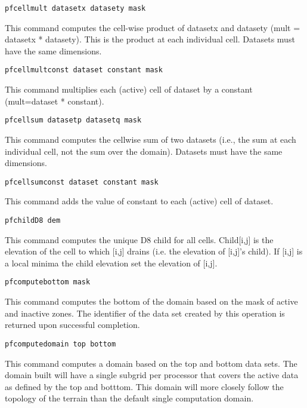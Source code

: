 \begin{description}
\item{\begin{verbatim}pfcellmult datasetx datasety mask\end{verbatim}}
This command computes the cell-wise product of datasetx and datasety (mult = datasetx * datasety).
This is the product at each individual cell. Datasets must have the same dimensions.

\item{\begin{verbatim}pfcellmultconst dataset constant mask\end{verbatim}}
This command multiplies each (active) cell of dataset by a constant (mult=dataset * constant). 


\item{\begin{verbatim}pfcellsum datasetp datasetq mask\end{verbatim}}
This command computes the cellwise sum of two datasets (i.e., the sum at each
individual cell, not the sum over the domain). Datasets must have the same
dimensions. 


\item{\begin{verbatim}pfcellsumconst dataset constant mask\end{verbatim}}
This command adds the value of constant to each (active) cell of dataset. 

\item{\begin{verbatim}pfchildD8 dem\end{verbatim}}
This command computes the unique D8 child for all cells. Child[i,j] is the
elevation of the cell to which [i,j] drains (i.e. the elevation of [i,j]'s 
child). If [i,j] is a local minima the child elevation set the elevation of [i,j].

\item{\begin{verbatim}pfcomputebottom mask\end{verbatim}}
This command computes the bottom of the domain based on the mask of active and inactive zones.
The identifier of the data set created by this operation is returned upon successful completion.

\item{\begin{verbatim}pfcomputedomain top bottom\end{verbatim}} This
 command computes a domain based on the top and bottom data sets.  The
 domain built will have a single subgrid per processor that covers the
 active data as defined by the top and botttom.  This domain will more
 closely follow the topology of the terrain than the default single
 computation domain.  


\end{description}
